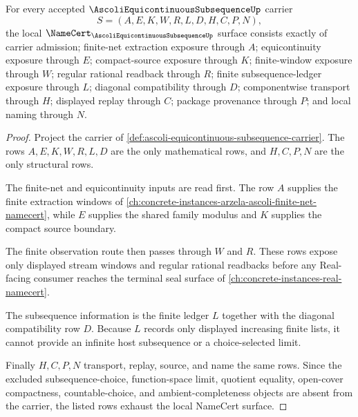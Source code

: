 \begin{theorem}
\label{thm:ascoli-equicontinuous-subsequence-obligations}
For every accepted $\AscoliEquicontinuousSubsequenceUp$ carrier
$$
S=(A,E,K,W,R,L,D,H,C,P,N),
$$
the local $\NameCert_{\AscoliEquicontinuousSubsequenceUp}$ surface consists exactly of carrier admission; finite-net extraction exposure through $A$; equicontinuity exposure through $E$; compact-source exposure through $K$; finite-window exposure through $W$; regular rational readback through $R$; finite subsequence-ledger exposure through $L$; diagonal compatibility through $D$; componentwise transport through $H$; displayed replay through $C$; package provenance through $P$; and local naming through $N$.
\end{theorem}
\begin{proof}
Project the carrier of \autoref{def:ascoli-equicontinuous-subsequence-carrier}. The rows $A,E,K,W,R,L,D$ are the only mathematical rows, and $H,C,P,N$ are the only structural rows.

The finite-net and equicontinuity inputs are read first. The row $A$ supplies the finite extraction windows of \autoref{ch:concrete-instances-arzela-ascoli-finite-net-namecert}, while $E$ supplies the shared family modulus and $K$ supplies the compact source boundary.

The finite observation route then passes through $W$ and $R$. These rows expose only displayed stream windows and regular rational readbacks before any Real-facing consumer reaches the terminal seal surface of \autoref{ch:concrete-instances-real-namecert}.

The subsequence information is the finite ledger $L$ together with the diagonal compatibility row $D$. Because $L$ records only displayed increasing finite lists, it cannot provide an infinite host subsequence or a choice-selected limit.

Finally $H,C,P,N$ transport, replay, source, and name the same rows. Since the excluded subsequence-choice, function-space limit, quotient equality, open-cover compactness, countable-choice, and ambient-completeness objects are absent from the carrier, the listed rows exhaust the local NameCert surface.
\end{proof}

